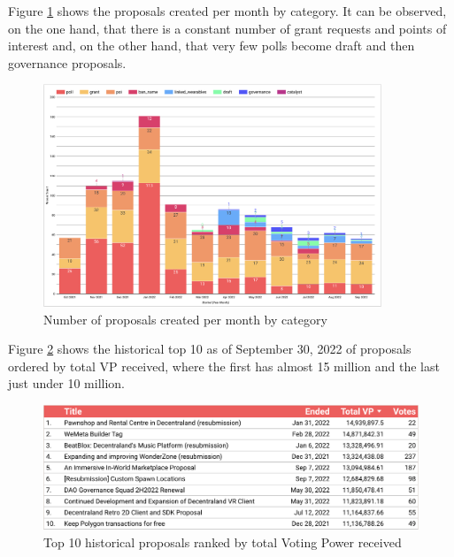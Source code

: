 \documentclass[MSE,Master,english]{twbook}%
\begin{document}
Figure \ref{fig:proposals_by_month} shows the proposals created per month by category. It can be observed, on the one hand, that there is a constant number of grant requests and points of interest and, on the other hand, that very few polls become draft and then governance proposals.
\begin{figure}[H]
  \centering
  \includegraphics[width=0.9\textwidth]{metrics/proposals_by_month.png}
  \caption{Number of proposals created per month by category}
  \label{fig:proposals_by_month}
\end{figure}

Figure \ref{fig:top_proposals} shows the historical top 10 as of September 30, 2022 of proposals ordered by total VP received, where the first has almost 15 million and the last just under 10 million.
\begin{figure}[H]
  \centering
  \includegraphics[width=\textwidth]{metrics/top_proposals.png}
  \caption{Top 10 historical proposals ranked by total Voting Power received}
  \label{fig:top_proposals}
\end{figure}
\end{document}
